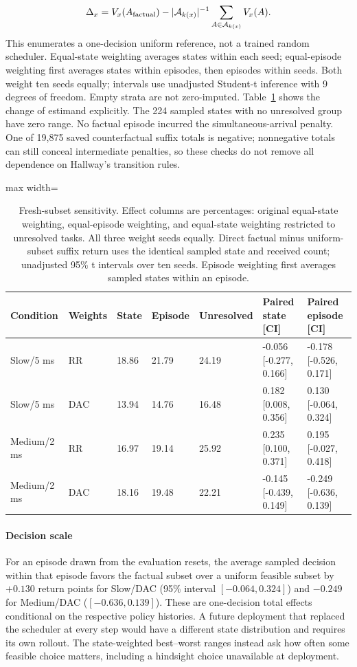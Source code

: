 \documentclass[11pt,a4paper]{article}
\begin{document}
\[
\Delta_x=V_x(A_{\rm factual})-|\mathcal A_{k(x)}|^{-1}\sum_{A\in\mathcal A_{k(x)}}V_x(A).
\]
This enumerates a one-decision uniform reference, not a trained random scheduler. Equal-state weighting averages states within each seed; equal-episode weighting first averages states within episodes, then episodes within seeds. Both weight ten seeds equally; intervals use unadjusted Student-t inference with 9 degrees of freedom. Empty strata are not zero-imputed. Table~\ref{tab:robust_strata} shows the change of estimand explicitly. The 224 sampled states with no unresolved group have zero range. No factual episode incurred the simultaneous-arrival penalty. One of 19,875 saved counterfactual suffix totals is negative; nonnegative totals can still conceal intermediate penalties, so these checks do not remove all dependence on Hallway's transition rules.

\begin{table}[htbp]\centering\setlength{\tabcolsep}{3pt}\footnotesize
\caption{Fresh-subset sensitivity. Effect columns are percentages: original equal-state weighting, equal-episode weighting, and equal-state weighting restricted to unresolved tasks. All three weight seeds equally. Direct factual minus uniform-subset suffix return uses the identical sampled state and received count; unadjusted 95\% t intervals over ten seeds. Episode weighting first averages sampled states within an episode.}\label{tab:robust_strata}
\begin{adjustbox}{max width=\linewidth}\begin{tabular}{lllllll}\toprule
Condition & Weights & State & Episode & Unresolved & Paired state [CI] & Paired episode [CI]\\\midrule
Slow/5 ms & RR & 18.86 & 21.79 & 24.19 & -0.056 [-0.277, 0.166] & -0.178 [-0.526, 0.171]\\
Slow/5 ms & DAC & 13.94 & 14.76 & 16.48 & 0.182 [0.008, 0.356] & 0.130 [-0.064, 0.324]\\
Medium/2 ms & RR & 16.97 & 19.14 & 25.92 & 0.235 [0.100, 0.371] & 0.195 [-0.027, 0.418]\\
Medium/2 ms & DAC & 18.16 & 19.48 & 22.21 & -0.145 [-0.439, 0.149] & -0.249 [-0.636, 0.139]\\
\bottomrule\end{tabular}\end{adjustbox}\end{table}

\paragraph{Decision scale}
For an episode drawn from the evaluation resets, the average sampled decision within that episode favors the factual subset over a uniform feasible subset by $+0.130$ return points for Slow/DAC (95\% interval $[-0.064,0.324]$) and $-0.249$ for Medium/DAC ($[-0.636,0.139]$). These are one-decision total effects conditional on the respective policy histories. A future deployment that replaced the scheduler at every step would have a different state distribution and requires its own rollout. The state-weighted best--worst ranges instead ask how often some feasible choice matters, including a hindsight choice unavailable at deployment.
\end{document}
